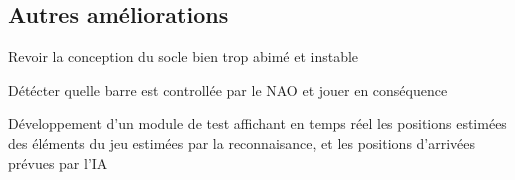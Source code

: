   \subsection{Autres améliorations}
  \label{sub:Autres améliorations}
    \par Revoir la conception du socle bien trop abimé et instable
    \par Détécter quelle barre est controllée par le NAO et jouer en conséquence
    \par Développement d'un module de test affichant en temps réel les positions estimées des éléments du jeu estimées par la reconnaisance, et les positions d'arrivées prévues par l'IA
\pagebreak
